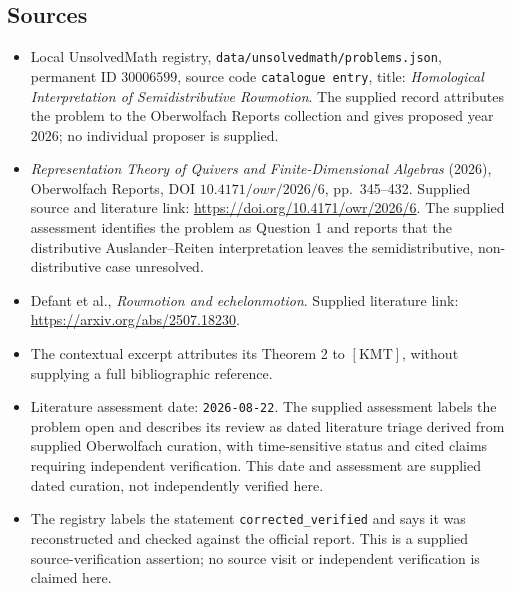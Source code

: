 \documentclass[11pt]{article}
\begin{document}
\subsection{Sources}
\begin{itemize}
\item Local UnsolvedMath registry, \texttt{data/unsolvedmath/problems.json}, permanent ID \(30006599\), source code \texttt{catalogue entry}, title: \emph{Homological Interpretation of Semidistributive Rowmotion}. The supplied record attributes the problem to the Oberwolfach Reports collection and gives proposed year \(2026\); no individual proposer is supplied.
\item \emph{Representation Theory of Quivers and Finite-Dimensional Algebras} (2026), Oberwolfach Reports, DOI \(10.4171/owr/2026/6\), pp.\ 345--432. Supplied source and literature link: \url{https://doi.org/10.4171/owr/2026/6}. The supplied assessment identifies the problem as Question 1 and reports that the distributive Auslander--Reiten interpretation leaves the semidistributive, non-distributive case unresolved.
\item Defant et al., \emph{Rowmotion and echelonmotion}. Supplied literature link: \url{https://arxiv.org/abs/2507.18230}.
\item The contextual excerpt attributes its Theorem 2 to \([\mathrm{KMT}]\), without supplying a full bibliographic reference.
\item Literature assessment date: \texttt{2026-08-22}. The supplied assessment labels the problem open and describes its review as dated literature triage derived from supplied Oberwolfach curation, with time-sensitive status and cited claims requiring independent verification. This date and assessment are supplied dated curation, not independently verified here.
\item The registry labels the statement \texttt{corrected\_verified} and says it was reconstructed and checked against the official report. This is a supplied source-verification assertion; no source visit or independent verification is claimed here.
\end{itemize}
\end{document}
